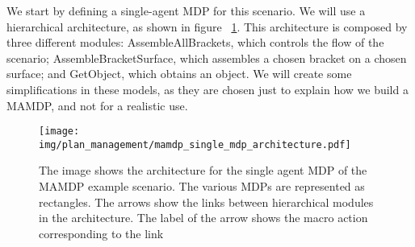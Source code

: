 We start by defining a single-agent MDP for this scenario. We will use a hierarchical architecture, as shown in figure ~\ref{fig:plan_management-mamdp_single_mdp_architecture}. This architecture is composed by three different modules: AssembleAllBrackets, which controls the flow of the scenario; AssembleBracketSurface, which assembles a chosen bracket on a chosen surface; and GetObject, which obtains an object. We will create some simplifications in these models, as they are chosen just to explain how we build a MAMDP, and not for a realistic use.

\begin{figure}[ht!]
	\texttt{[image: img/plan\_management/mamdp\_single\_mdp\_architecture.pdf]}
	\caption[MAMDP example single MDP]{The image shows the architecture for the single agent MDP of the MAMDP example scenario. The various MDPs are represented as rectangles. The arrows show the links between hierarchical modules in the architecture. The label of the arrow shows the macro action corresponding to the link}
	\label{fig:plan_management-mamdp_single_mdp_architecture}
\end{figure}


